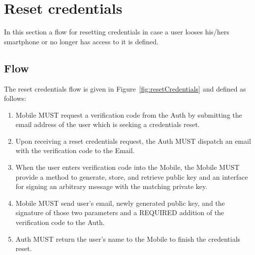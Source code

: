 \section{Reset credentials}
In this section a flow for resetting credentials in case a user looses his/hers
smartphone or no longer has access to it is defined. 

    \subsection{Flow}
    The reset credentials flow is given in Figure~\ref{fig:resetCredentials} and defined as follows:
        \begin{enumerate}
            \item Mobile MUST request a verification code from the Auth by submitting the email address of the user
                  which is seeking a credentials reset.
            \item Upon receiving a reset credentials request, the Auth MUST dispatch an email with the verification
                  code to the Email.
            \item When the user enters verification code into the Mobile, the Mobile MUST provide a method to generate,
                  store, and retrieve public key and an interface for signing an arbitrary message with the matching 
                  private key.
            \item Mobile MUST send user's email, newly generated public key, and the signature of those two parameters
                  and a REQUIRED addition of the verification code to the Auth.
            \item Auth MUST return the user's name to the Mobile to finish the credentials reset.
        \end{enumerate}
        

